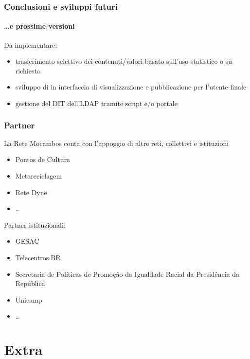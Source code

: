 \documentclass{beamer}
\begin{document}
\begin{frame}
 \frametitle{Conclusioni e sviluppi futuri}
  \framesubtitle{\ldots e prossime versioni}
 
  Da implementare:
  \begin{itemize}
  \item trasferimento selettivo dei contenuti/valori basato sull'uso
    statistico o su richiesta
  \item sviluppo di in interfaccia di visualizzazione e pubblicazione
    per l'utente finale
  \item gestione del DIT dell'LDAP tramite script e/o portale
  \end{itemize}
\end{frame}

\begin{frame}
 \frametitle{Partner}
 La Rete Mocambos conta con l'appoggio di altre reti, collettivi e istituzioni
  
  \begin{itemize}
  \item Pontos de Cultura 
  \item Metareciclagem
  \item Rete Dyne 
  \item \ldots
  \end{itemize}
  
  Partner istituzionali:
  \begin{itemize}
  \item GESAC
  \item Telecentros.BR
  \item Secretaria de Políticas de Promoção da Igualdade Racial da
    Presidência da República
  \item Unicamp 
  \item \ldots
  \end{itemize}
  
\end{frame}

\section{Extra}

\begin{frame}
  \frametitle{}
 \end{frame}
\end{document}
